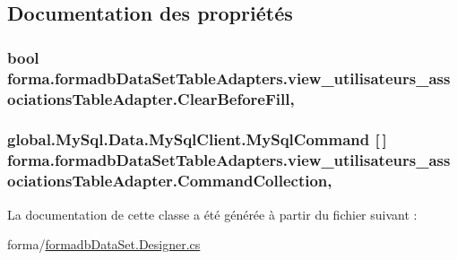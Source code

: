 \subsection{Documentation des propriétés}
\subsubsection[{\texorpdfstring{Clear\+Before\+Fill}{ClearBeforeFill}}]{\setlength{\rightskip}{0pt plus 5cm}bool forma.\+formadb\+Data\+Set\+Table\+Adapters.\+view\+\_\+utilisateurs\+\_\+associations\+Table\+Adapter.\+Clear\+Before\+Fill\hspace{0.3cm}{\ttfamily [get]}, {\ttfamily [set]}}\hypertarget{classforma_1_1formadb_data_set_table_adapters_1_1view__utilisateurs__associations_table_adapter_ac8f2bfed630e889035b9cfde828729e1}{}\label{classforma_1_1formadb_data_set_table_adapters_1_1view__utilisateurs__associations_table_adapter_ac8f2bfed630e889035b9cfde828729e1}
\subsubsection[{\texorpdfstring{Command\+Collection}{CommandCollection}}]{\setlength{\rightskip}{0pt plus 5cm}global.\+My\+Sql.\+Data.\+My\+Sql\+Client.\+My\+Sql\+Command \mbox{[}$\,$\mbox{]} forma.\+formadb\+Data\+Set\+Table\+Adapters.\+view\+\_\+utilisateurs\+\_\+associations\+Table\+Adapter.\+Command\+Collection\hspace{0.3cm}{\ttfamily [get]}, {\ttfamily [protected]}}\hypertarget{classforma_1_1formadb_data_set_table_adapters_1_1view__utilisateurs__associations_table_adapter_a70e167e9b7b66060d71c674a5c1758d9}{}\label{classforma_1_1formadb_data_set_table_adapters_1_1view__utilisateurs__associations_table_adapter_a70e167e9b7b66060d71c674a5c1758d9}


La documentation de cette classe a été générée à partir du fichier suivant \+:\begin{DoxyCompactItemize}
\item 
forma/\hyperlink{formadb_data_set_8_designer_8cs}{formadb\+Data\+Set.\+Designer.\+cs}\end{DoxyCompactItemize}
